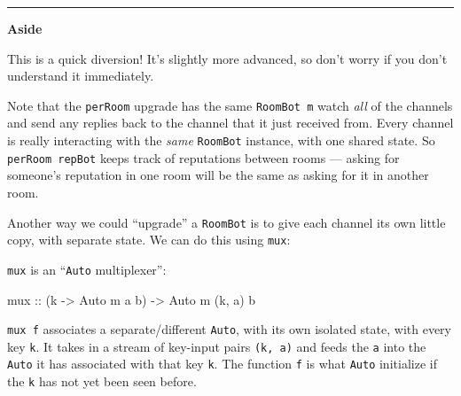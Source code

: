 \documentclass[]{article}
\newenvironment{Shaded}{}{}
\newcommand{\KeywordTok}[1]{\textcolor[rgb]{0.00,0.44,0.13}{\textbf{{#1}}}}
\newcommand{\DataTypeTok}[1]{\textcolor[rgb]{0.56,0.13,0.00}{{#1}}}
\newcommand{\CommentTok}[1]{\textcolor[rgb]{0.38,0.63,0.69}{\textit{{#1}}}}
\newcommand{\OtherTok}[1]{\textcolor[rgb]{0.00,0.44,0.13}{{#1}}}
\newcommand{\FunctionTok}[1]{\textcolor[rgb]{0.02,0.16,0.49}{{#1}}}
\newcommand{\NormalTok}[1]{{#1}}
\begin{document}
\begin{center}\rule{0.5\linewidth}{\linethickness}\end{center}

\textbf{Aside}

This is a quick diversion! It's slightly more advanced, so don't worry if you
don't understand it immediately.

Note that the \texttt{perRoom} upgrade has the same \texttt{RoomBot\ m} watch
\emph{all} of the channels and send any replies back to the channel that it just
received from. Every channel is really interacting with the \emph{same}
\texttt{RoomBot} instance, with one shared state. So \texttt{perRoom\ repBot}
keeps track of reputations between rooms --- asking for someone's reputation in
one room will be the same as asking for it in another room.

Another way we could ``upgrade'' a \texttt{RoomBot} is to give each channel its
own little copy, with separate state. We can do this using \texttt{mux}:

\begin{Shaded}
\end{Shaded}

\texttt{mux} is an ``\texttt{Auto} multiplexer'':

\begin{Shaded}
\begin{Highlighting}[]
\OtherTok{mux ::} \NormalTok{(k }\OtherTok{->} \DataTypeTok{Auto} \NormalTok{m a b) }\OtherTok{->} \DataTypeTok{Auto} \NormalTok{m (k, a) b}
\end{Highlighting}
\end{Shaded}

\texttt{mux\ f} associates a separate/different \texttt{Auto}, with its own
isolated state, with every key \texttt{k}. It takes in a stream of key-input
pairs \texttt{(k,\ a)} and feeds the \texttt{a} into the \texttt{Auto} it has
associated with that key \texttt{k}. The function \texttt{f} is what
\texttt{Auto} initialize if the \texttt{k} has not yet been seen before.
\end{document}
